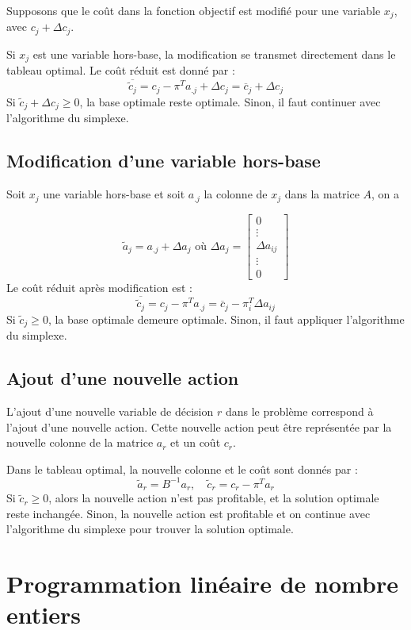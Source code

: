 \documentclass{report}
\begin{document}
\begin{multicols*}{2}
Supposons que le coût dans la fonction objectif est modifié pour une variable 
\( x_j \), avec \( c_j + \Delta c_j \).

Si \( x_j \) est une variable hors-base, la modification se transmet directement
dans le tableau optimal. Le coût réduit est donné par :
\[
    \boxed{\overline{\tilde{c}_j} = c_j - \pi^T a_{.j} + \Delta c_j = \overline{c}_j 
    + \Delta c_j}
\]
Si \( \tilde{c}_j + \Delta c_j \geq 0 \), la base optimale reste optimale. 
Sinon, il faut continuer avec l'algorithme du simplexe.

\section{Modification d'une variable hors-base}
Soit $x_j$ une variable hors-base et soit $a_{.j}$ la colonne 
de $x_j$ dans la matrice $A$, on a 

\[
    \tilde{a}_j =  a_{.j} + \Delta a_j \text{ où }  \Delta a_j = 
\begin{bmatrix}
0 \\
\vdots \\
\Delta a_{ij} \\
\vdots \\
0
\end{bmatrix}
\]
Le coût réduit après modification est :
\[
    \boxed{\overline{\tilde{c}_j} = c_j - \pi^T a_{.j} 
    =\overline{c}_j - \pi^T_i \Delta a_{ij}}
\]
Si \( \tilde{c}_j \geq 0 \), la base optimale demeure optimale. Sinon, il faut 
appliquer l'algorithme du simplexe.

\section{Ajout d'une nouvelle action}

L'ajout d'une nouvelle variable de décision \( r \) dans le problème correspond
à l'ajout d'une nouvelle action. Cette nouvelle action peut être représentée 
par la nouvelle colonne de la matrice \( a_r \) et un coût \( c_r \).

Dans le tableau optimal, la nouvelle colonne et le coût sont donnés par :
\[
\boxed{\tilde{a}_r = B^{-1} a_r, \quad \tilde{c}_r = c_r - \pi^T a_r}
\]
Si \( \tilde{c}_r \geq 0 \), alors la nouvelle action n'est pas profitable, et
la solution optimale reste inchangée. Sinon, la nouvelle action est profitable 
et on continue avec l'algorithme du simplexe pour trouver la solution optimale.

\chapter{Programmation linéaire de nombre entiers}



\end{multicols*}
\end{document}
